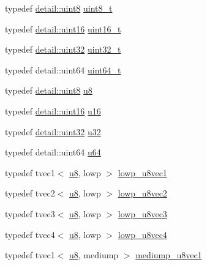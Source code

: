 \begin{DoxyCompactItemize}
\item 
typedef \hyperlink{stb__image_8c_adde6aaee8457bee49c2a92621fe22b79}{detail\+::uint8} \hyperlink{group__gtc__type__precision_ga93adf6dd9803408f3e3aaf9dedda352b}{uint8\+\_\+t}
\item 
typedef \hyperlink{stb__image_8c_a05f6b0ae8f6a6e135b0e290c25fe0e4e}{detail\+::uint16} \hyperlink{group__gtc__type__precision_gac4eb4f43cae8129b00086dc234d3b8fc}{uint16\+\_\+t}
\item 
typedef \hyperlink{stb__image_8c_a1134b580f8da4de94ca6b1de4d37975e}{detail\+::uint32} \hyperlink{group__gtc__type__precision_ga822ca53a9ad412504532838906276a99}{uint32\+\_\+t}
\item 
typedef detail\+::uint64 \hyperlink{group__gtc__type__precision_ga058f57c19e1befdcf12498944bd73e69}{uint64\+\_\+t}
\item 
typedef \hyperlink{stb__image_8c_adde6aaee8457bee49c2a92621fe22b79}{detail\+::uint8} \hyperlink{group__gtc__type__precision_ga5e3dc67373d5068997d2d9f41c9024d2}{u8}
\item 
typedef \hyperlink{stb__image_8c_a05f6b0ae8f6a6e135b0e290c25fe0e4e}{detail\+::uint16} \hyperlink{group__gtc__type__precision_gae7a1571503f83d2264ddfa705a6b082a}{u16}
\item 
typedef \hyperlink{stb__image_8c_a1134b580f8da4de94ca6b1de4d37975e}{detail\+::uint32} \hyperlink{group__gtc__type__precision_ga54e837745059fd29017bed71cfa0a8db}{u32}
\item 
typedef detail\+::uint64 \hyperlink{group__gtc__type__precision_ga71cedd4972f9cb1a5e14dfe5ab83ecd7}{u64}
\item 
typedef tvec1$<$ \hyperlink{group__gtc__type__precision_ga5e3dc67373d5068997d2d9f41c9024d2}{u8}, lowp $>$ \hyperlink{namespaceglm_a4d00e78f5355c1448fa1df91316921e7}{lowp\+\_\+u8vec1}
\item 
typedef tvec2$<$ \hyperlink{group__gtc__type__precision_ga5e3dc67373d5068997d2d9f41c9024d2}{u8}, lowp $>$ \hyperlink{namespaceglm_ad36641fb792346ac7ca4d78b57939371}{lowp\+\_\+u8vec2}
\item 
typedef tvec3$<$ \hyperlink{group__gtc__type__precision_ga5e3dc67373d5068997d2d9f41c9024d2}{u8}, lowp $>$ \hyperlink{namespaceglm_aad3c30445b2325a2e864c90a732c017a}{lowp\+\_\+u8vec3}
\item 
typedef tvec4$<$ \hyperlink{group__gtc__type__precision_ga5e3dc67373d5068997d2d9f41c9024d2}{u8}, lowp $>$ \hyperlink{namespaceglm_a92e38081e667dd04e6a95817e9c4885e}{lowp\+\_\+u8vec4}
\item 
typedef tvec1$<$ \hyperlink{group__gtc__type__precision_ga5e3dc67373d5068997d2d9f41c9024d2}{u8}, mediump $>$ \hyperlink{namespaceglm_aa03de8f939e9f1292ef43fe5dbfcbbfb}{mediump\+\_\+u8vec1}

\end{DoxyCompactItemize}
